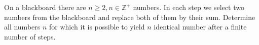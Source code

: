 On a blackboard there are $ n \geq 2, n \in \mathbb{Z}^{+}$ numbers. In each step we select two numbers from the blackboard and replace both of them by their sum. Determine all numbers $ n$ for which it is possible to yield $ n$ identical number after a finite number of steps.
